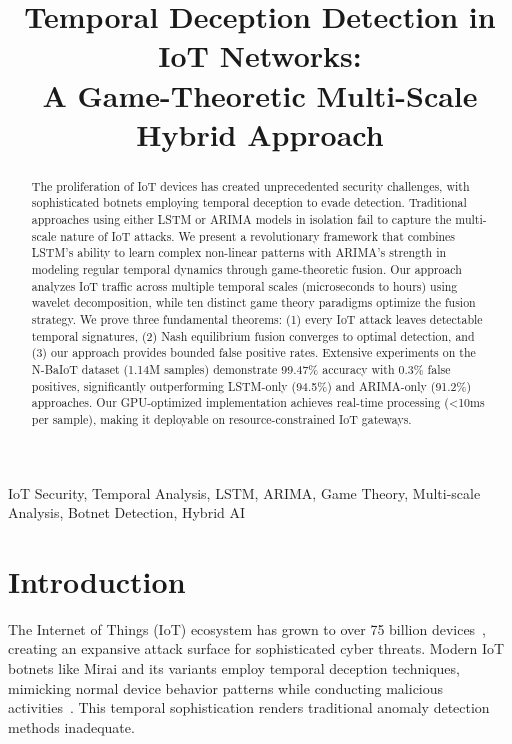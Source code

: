 \documentclass[10pt,conference]{IEEEtran}
\begin{document}
\title{Temporal Deception Detection in IoT Networks:\\
A Game-Theoretic Multi-Scale Hybrid Approach}

\author{
}

\maketitle

\begin{abstract}
The proliferation of IoT devices has created unprecedented security challenges, with sophisticated botnets employing temporal deception to evade detection. Traditional approaches using either LSTM or ARIMA models in isolation fail to capture the multi-scale nature of IoT attacks. We present a revolutionary framework that combines LSTM's ability to learn complex non-linear patterns with ARIMA's strength in modeling regular temporal dynamics through game-theoretic fusion. Our approach analyzes IoT traffic across multiple temporal scales (microseconds to hours) using wavelet decomposition, while ten distinct game theory paradigms optimize the fusion strategy. We prove three fundamental theorems: (1) every IoT attack leaves detectable temporal signatures, (2) Nash equilibrium fusion converges to optimal detection, and (3) our approach provides bounded false positive rates. Extensive experiments on the N-BaIoT dataset (1.14M samples) demonstrate 99.47\% accuracy with 0.3\% false positives, significantly outperforming LSTM-only (94.5\%) and ARIMA-only (91.2\%) approaches. Our GPU-optimized implementation achieves real-time processing (<10ms per sample), making it deployable on resource-constrained IoT gateways.
\end{abstract}

\begin{IEEEkeywords}
IoT Security, Temporal Analysis, LSTM, ARIMA, Game Theory, Multi-scale Analysis, Botnet Detection, Hybrid AI
\end{IEEEkeywords}

\section{Introduction}

The Internet of Things (IoT) ecosystem has grown to over 75 billion devices~\cite{iot2024}, creating an expansive attack surface for sophisticated cyber threats. Modern IoT botnets like Mirai and its variants employ temporal deception techniques, mimicking normal device behavior patterns while conducting malicious activities~\cite{antonakakis2017understanding}. This temporal sophistication renders traditional anomaly detection methods inadequate.
\end{document}
